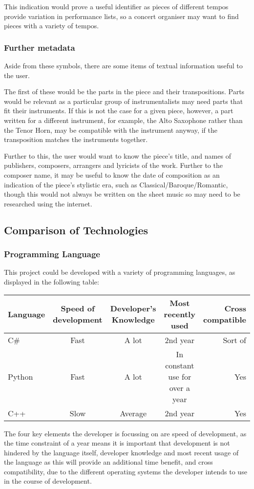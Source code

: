 This indication would prove a useful identifier as pieces of different tempos provide variation in performance lists, so a concert organiser may want to find pieces with a variety of tempos.

\subsubsection{Further metadata}
Aside from these symbols, there are some items of textual information useful to the user. 

The first of these would be the parts in the piece and their transpositions. Parts would be relevant as a particular group of instrumentalists may need parts that fit their instruments. If this is not the case for a given piece, however, a part written for a different instrument, for example, the Alto Saxophone rather than the Tenor Horn, may be compatible with the instrument anyway, if the transposition matches the instruments together.

Further to this, the user would want to know the piece's title, and names of publishers, composers, arrangers and lyricists of the work. Further to the composer name, it may be useful to know the date of composition as an indication of the piece's stylistic era, such as Classical/Baroque/Romantic, though this would not always be written on the sheet music so may need to be researched using the internet.


\subsection{Comparison of Technologies}
\subsubsection{Programming Language}
This project could be developed with a variety of programming languages, as displayed in the following table:

\begin{center}
\begin{tabular}{| l | c | c | c | r |} \hline
  {Language} & {Speed of development} & {Developer's Knowledge} & {Most recently used} & {Cross compatible} \\ \hline
  C\# & Fast & A lot & 2nd year & Sort of \\ \hline
  Python & Fast & A lot & In constant use for over a year & Yes \\ \hline
  C++ & Slow & Average & 2nd year & Yes \\ \hline
\end{tabular}
\end{center}
The four key elements the developer is focussing on are speed of development, as the time constraint of a year means it is important that development is not hindered by the language itself, developer knowledge and most recent usage of the language as this will provide an additional time benefit, and cross compatibility, due to the different operating systems the developer intends to use in the course of development.

